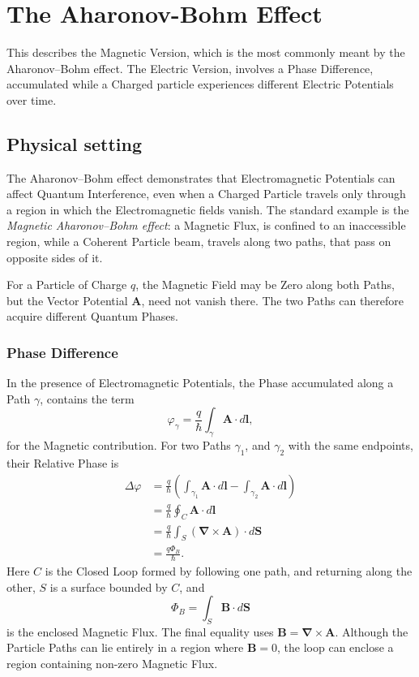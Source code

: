 \documentclass[a4paper, 10pt, onepage]{elegantbook}
\begin{document}
\chapter{The Aharonov-Bohm Effect}

This describes the Magnetic Version, which is the most commonly meant by the Aharonov–Bohm effect. The Electric Version, involves a Phase Difference, accumulated while a Charged particle experiences different Electric Potentials over time.  \\

\section{Physical setting}

The Aharonov--Bohm effect demonstrates that Electromagnetic Potentials can affect Quantum Interference, even when a Charged Particle travels only through a region in which the Electromagnetic fields vanish. The standard example is the \emph{Magnetic Aharonov--Bohm effect}: a Magnetic Flux, is confined to an inaccessible region, while a Coherent Particle beam, travels along two paths, that pass on opposite sides of it.

For a Particle of Charge \(q\), the Magnetic Field may be Zero along both Paths, but the Vector Potential \(\mathbf{A}\), need not vanish
there. The two Paths can therefore acquire different Quantum Phases.

\subsection{Phase Difference}

In the presence of Electromagnetic Potentials, the Phase accumulated along a Path \(\gamma\), contains the term
\begin{equation}
\varphi_\gamma
=
\frac{q}{\hbar}\int_\gamma \mathbf{A}\cdot d\mathbf{l},
\end{equation}
for the Magnetic contribution. For two Paths \(\gamma_1\), and \(\gamma_2\) with the same endpoints, their Relative Phase is
\begin{align}
\Delta\varphi
&=
\frac{q}{\hbar}
\left(
\int_{\gamma_1}\mathbf{A}\cdot d\mathbf{l}
-
\int_{\gamma_2}\mathbf{A}\cdot d\mathbf{l}
\right)\\
&=
\frac{q}{\hbar}\oint_C\mathbf{A}\cdot d\mathbf{l}\\
&=
\frac{q}{\hbar}\int_S
(\boldsymbol{\nabla}\times\mathbf{A})\cdot d\mathbf{S}\\
&=
\frac{q\Phi_B}{\hbar}.
\end{align}
Here \(C\) is the Closed Loop formed by following one path, and returning along the other, \(S\) is a surface bounded by \(C\), and
\[
\Phi_B=\int_S\mathbf{B}\cdot d\mathbf{S}
\]
is the enclosed Magnetic Flux. The final equality uses
\(\mathbf{B}=\boldsymbol{\nabla}\times\mathbf{A}\). Although the Particle Paths can lie entirely in a region where
\(\mathbf{B}=0\), the loop can enclose a region containing non-zero Magnetic Flux.
\end{document}
